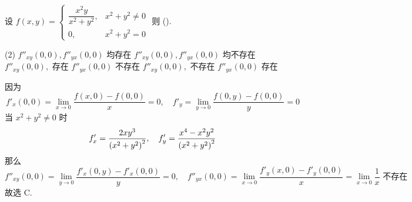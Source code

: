 \begin{example}
    设 $f(x,y)=\begin{cases}
            \dfrac{x^2y}{x^2+y^2}, & x^2+y^2\neq 0 \\
            0,                     & x^2+y^2=0
        \end{cases}$ 则 (\quad).
    \begin{tasks}(2)
        \task $f''_{xy}(0,0), f''_{yx}(0,0)$ 均存在
        \task $f''_{xy}(0,0), f''_{yx}(0,0)$ 均不存在
        \task $f''_{xy}(0,0), $ 存在 $ f''_{yx}(0,0)$ 不存在
        \task $f''_{xy}(0,0), $ 不存在 $ f''_{yx}(0,0)$ 存在
    \end{tasks}
\end{example}
\begin{solution}
    因为 $$
        f'_x(0,0)=\lim_{x \to 0}\dfrac{f(x,0)-f(0,0)}{x}=0,\quad f'_y=\lim_{y \to 0}\dfrac{f(0,y)-f(0,0)}{y}=0
    $$
    当 $x^2+y^2\neq 0$ 时
    $$
        f'_x=\dfrac{2xy^3}{\qty(x^2+y^2)^2},\quad f'_y=\dfrac{x^4-x^2y^2}{\qty(x^2+y^2)^2}
    $$
    那么 $$
        f''_{xy}(0,0)=\lim_{y \to 0}\dfrac{f'_x(0,y)-f'_x(0,0)}{y}=0,\quad f''_{yx}(0,0)=\lim_{x \to 0}\dfrac{f'_y(x,0)-f'_y(0,0)}{x}=\lim_{x \to 0}\dfrac{1}{x}\text{ 不存在}
    $$
    故选 C.
\end{solution}

